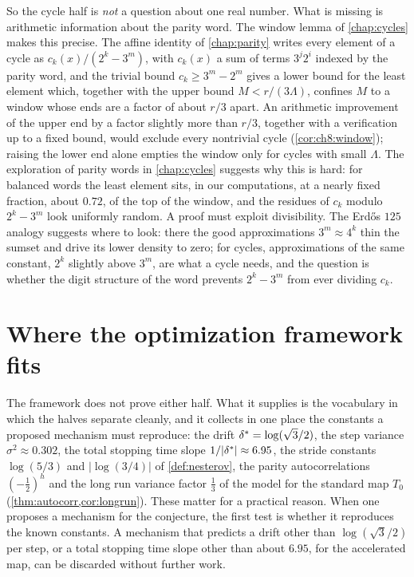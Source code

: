 So the cycle half is \emph{not} a question about one real number. What is missing is
arithmetic information about the parity word. The window lemma of
\cref{chap:cycles} makes this precise. The affine identity of
\cref{chap:parity} writes every element of a cycle as $c_k(x)/(2^k-3^m)$, with
$c_k(x)$ a sum of terms $3^j2^i$ indexed by the parity word, and the trivial
bound $c_k\ge3^m-2^m$ gives a lower bound for the least element which, together
with the upper bound $M<r/(3\Lambda)$, confines $M$ to a window whose ends are
a factor of about $r/3$ apart.
An arithmetic improvement of the upper end by a factor slightly more than $r/3$, together with a verification up to a fixed bound, would exclude every nontrivial cycle (\cref{cor:ch8:window}); raising the lower end alone empties the window only for cycles with small $\Lambda$.
The exploration of parity words in
\cref{chap:cycles} suggests why this is hard: for balanced words the least element
sits, in our computations, at a nearly fixed fraction, about $0.72$, of the top of the window, and the
residues of $c_k$ modulo $2^k-3^m$ look uniformly random. A proof must exploit
divisibility. The Erd\H{o}s $125$ analogy suggests where to look: there the good
approximations $3^m\approx4^k$ thin the sumset and drive its lower density to
zero; for cycles, approximations of the same constant, $2^k$ slightly above $3^m$, are what a cycle needs, and the
question is whether the digit structure of the word prevents
$2^k-3^m$ from ever dividing $c_k$.

\section{Where the optimization framework fits}\label{sec:ch10:fits}

The framework does not prove either half. What it supplies is the vocabulary in
which the halves separate cleanly, and it collects in one place the constants a
proposed mechanism must reproduce: the drift $\delta^{*}=\log(\sqrt3/2)$, the step variance
$\sigma^2\approx0.302$, the total stopping time slope $1/|\delta^{*}|\approx6.95$, the stride
constants $\log(5/3)$ and $|\log(3/4)|$ of \cref{def:nesterov}, the parity autocorrelations $(-\tfrac12)^h$ and the long run variance factor $\tfrac13$ of the model for the standard map $T_0$ (\cref{thm:autocorr,cor:longrun}). These matter for a
practical reason. When one proposes a mechanism for the conjecture, the first
test is whether it reproduces the known constants. A mechanism that predicts a
drift other than $\log(\sqrt3/2)$ per step, or a total stopping time slope other than about
$6.95$, for the accelerated map, can be discarded without further work.


